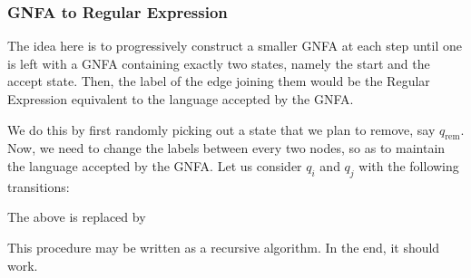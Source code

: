 \subsubsection*{GNFA to Regular Expression}
The idea here is to progressively construct a smaller GNFA at each step until one is left with a GNFA containing exactly two states, namely the start and the accept state. Then, the label of the edge joining them would be the Regular Expression equivalent to the language accepted by the GNFA.

We do this by first randomly picking out a state that we plan to remove, say $q_\text{rem}$. Now, we need to change the labels between every two nodes, so as to maintain the language accepted by the GNFA. Let us consider $q_i$ and $q_j$ with the following transitions:
\begin{center}
\end{center}

The above is replaced by 
\begin{center}
\end{center}

This procedure may be written as a recursive algorithm. In the end, it should work.

